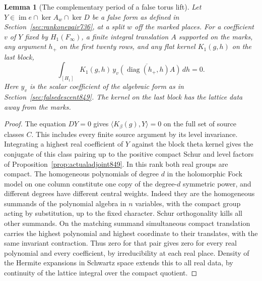 \documentclass[a4paper,11pt]{article}
\newtheorem{lemma}[proposition]{Lemma}
\theoremstyle{definition}
\theoremstyle{remark}
\numberwithin{equation}{section}
\begin{document}
\begin{lemma}[The complementary period of a false torus lift]
\leavevmode\label{lem:falseline854}
Let \(Y\in\operatorname{im}e\cap\ker A_w\cap\ker D\) be a false
form as defined in Section~\ref{sec:rankonepair736}, at a split
\(w\) off the marked places. For a coefficient \(v\) of \(Y\)
fixed by \(H_1(F_\infty)\), a finite integral translation \(A\)
supported on the marks, any argument \(h_+\) on the first
twenty rows, and any flat kernel \(K_1(g,h)\) on the last block,
\[
  \int_{[H_1]}K_1(g,h)\,
      \overline{y_v(\operatorname{diag}(h_+,h)A)}\,dh=0 .
\]
Here \(y_v\) is the scalar coefficient of the algebraic form as
in Section~\ref{sec:falsedescent849}. The kernel on the last
block has the lattice data away from the marks.
\end{lemma}
\begin{proof}
The equation \(DY=0\) gives \(\langle K_\beta(g),Y\rangle=0\)
on the full set of source classes \(C\). This includes every
finite source argument by its level invariance. Integrating
a highest real coefficient of \(Y\) against the block theta
kernel gives the conjugate of this class pairing up to the
positive compact Schur and level factors of
Proposition~\ref{prop:actualadjoint849}. In this rank both real
groups are compact. The homogeneous polynomials of degree \(d\)
in the holomorphic Fock model on one column constitute one
copy of the degree-\(d\) symmetric power, and different degrees
have different central weights. Indeed they are the homogeneous
summands of the polynomial algebra in \(n\) variables, with the
compact group acting by substitution, up to the fixed character.
Schur orthogonality kills all other summands. On the matching
summand simultaneous compact translation carries the highest
polynomial and highest coordinate to their translates, with
the same invariant contraction. Thus zero for that pair gives
zero for every real polynomial and every coefficient, by
irreducibility at each real place. Density of the Hermite
expansions in Schwartz space extends this to all real data,
by continuity of the lattice integral over the compact quotient.


\end{proof}
\end{document}
